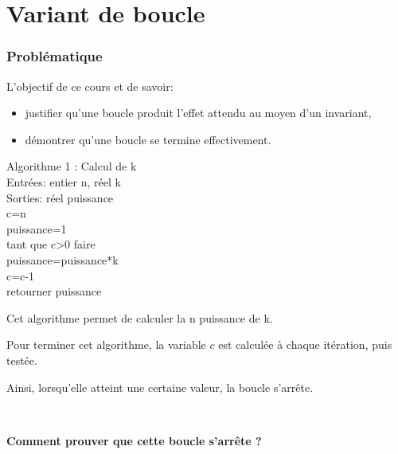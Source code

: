 

\section{Variant de boucle} 


\begin{frame}[fragile]
\frametitle{Problématique}

\begin{obj}
L'objectif de ce cours et de savoir:
\begin{itemize}
 \item justifier qu'une boucle produit l'effet attendu au moyen d'un invariant,
 \item démontrer qu'une boucle se termine effectivement.
\end{itemize}
\end{obj}

\begin{minipage}{0.4\linewidth}
Algorithme 1 : Calcul de k \\
Entrées: entier n, réel k \\
Sorties: réel puissance \\
c=n \\
puissance=1 \\
tant que c>0 faire \\
\hspace*{1cm} puissance=puissance*k \\
\hspace*{1cm} c=c-1 \\
retourner puissance
\end{minipage}\hfill
\begin{minipage}{0.56\linewidth}
Cet algorithme permet de calculer la n puissance de k.

Pour terminer cet algorithme, la variable $c$ est calculée à chaque itération, puis testée.

Ainsi, lorsqu'elle atteint une certaine valeur, la boucle s'arrête.

~\

\textbf{Comment prouver que cette boucle s'arrête ?}
\end{minipage}
\end{frame}

